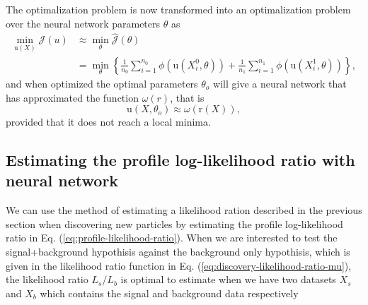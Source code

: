 \documentclass[../../main/main.tex]{subfiles}
\begin{document}
The optimalization problem is now transformed into an optimalization problem over the neural network parameters \(\theta\) as
\begin{align*}
  \min_{\mathrm{u}(X)} \mathcal{J}(u) &\approx \min_{\theta} \hat{\mathcal{J}}(\theta) \\
                            &= \min_{\theta}\left\{ \frac{1}{n_0}\sum_{i=1}^{n_0} \phi(\mathrm{u}(X_i^0,\theta)) + \frac{1}{n_1}\sum_{i=1}^{n_1} \phi(\mathrm{u}(X_i^1,\theta))\right\},
\end{align*}
and when optimized the optimal parameters \(\theta_o\) will give a neural network that has approximated the function \(\omega(r)\), that is
\begin{equation}
  \label{eq:9}
  \mathrm{u}(X,\theta_o) \approx \omega(\mathrm{r}(X)),
\end{equation}
provided that it does not reach a local minima.

\subsection{Estimating the profile log-likelihood ratio with neural network}
\label{sec:estim-prof-log}

We can use the method of estimating a likelihood ration described in the previous section when discovering new particles by estimating the profile log-likelihood ratio in Eq. (\ref{eq:profile-likelihood-ratio}). When we are interested to test the signal+background hypothisis against the background only hypothisis, which is given in the likelihood ratio function in Eq. (\ref{eq:discovery-likelihood-ratio-mu}), the likelihood ratio \(L_s/L_b\) is optimal to estimate when we have two datasets \(X_s\) and \(X_b\) which contains the signal and background data respectively
\end{document}

